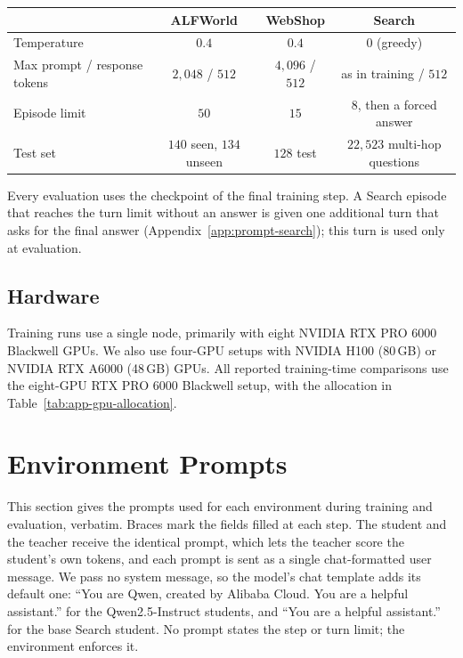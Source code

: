 \begin{center}\small
\begin{tabular}{@{}l c c c@{}}
\toprule
 & ALFWorld & WebShop & Search \\
\midrule
Temperature & $0.4$ & $0.4$ & $0$ (greedy) \\
Max prompt / response tokens & $2{,}048$ / $512$ & $4{,}096$ / $512$ & as in training / $512$ \\
Episode limit & $50$ & $15$ & $8$, then a forced answer \\
Test set & $140$ seen, $134$ unseen & $128$ test & $22{,}523$ multi-hop questions \\
\bottomrule
\end{tabular}
\end{center}

\noindent Every evaluation uses the checkpoint of the final training step. A Search episode that
reaches the turn limit without an answer is given one additional turn that asks for the final answer
(Appendix~\ref{app:prompt-search}); this turn is used only at evaluation.


\subsection{Hardware}

Training runs use a single node, primarily with eight NVIDIA RTX PRO 6000
Blackwell GPUs. We also use four-GPU setups with NVIDIA H100 (80\,GB) or
NVIDIA RTX A6000 (48\,GB) GPUs. All reported training-time comparisons use the
eight-GPU RTX PRO 6000 Blackwell setup, with the allocation in
Table~\ref{tab:app-gpu-allocation}.

\section{Environment Prompts}
\label{app:prompts}

This section gives the prompts used for each environment during training and evaluation, verbatim.
Braces mark the fields filled at each step. The student and the teacher receive the identical prompt,
which lets the teacher score the student's own tokens, and each prompt is sent as a single
chat-formatted user message. We pass no system message, so the model's chat template adds its default
one: ``You are Qwen, created by Alibaba Cloud. You are a helpful assistant.'' for the Qwen2.5-Instruct
students, and ``You are a helpful assistant.'' for the base Search student. No prompt states the step
or turn limit; the environment enforces it.

